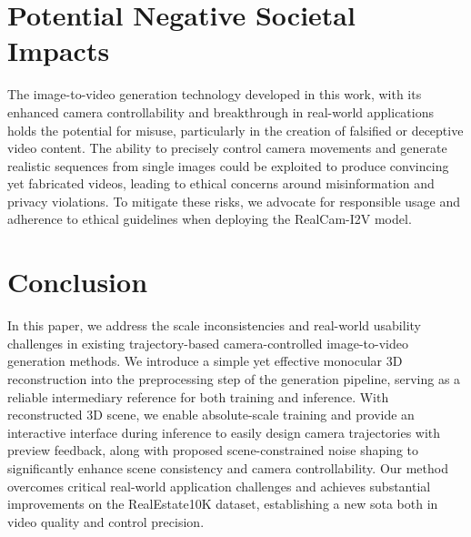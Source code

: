 \section{Potential Negative Societal Impacts}
The image-to-video generation technology developed in this work, with its enhanced camera controllability and breakthrough in real-world applications holds the potential for misuse, particularly in the creation of falsified or deceptive video content. 
The ability to precisely control camera movements and generate realistic sequences from single images could be exploited to produce convincing yet fabricated videos, leading to ethical concerns around misinformation and privacy violations. 
To mitigate these risks, we advocate for responsible usage and adherence to ethical guidelines when deploying the RealCam-I2V model. 

\section{Conclusion}
\label{sec:conclusion}
In this paper, we address the scale inconsistencies and real-world usability challenges in existing trajectory-based camera-controlled image-to-video generation methods. We introduce a simple yet effective monocular 3D reconstruction into the preprocessing step of the generation pipeline, serving as a reliable intermediary reference for both training and inference. With reconstructed 3D scene, we enable absolute-scale training and provide an interactive interface during inference to easily design camera trajectories with preview feedback, along with proposed scene-constrained noise shaping to significantly enhance scene consistency and camera controllability. Our method overcomes critical real-world application challenges and achieves substantial improvements on the RealEstate10K dataset, establishing a new sota both in video quality and control precision.
